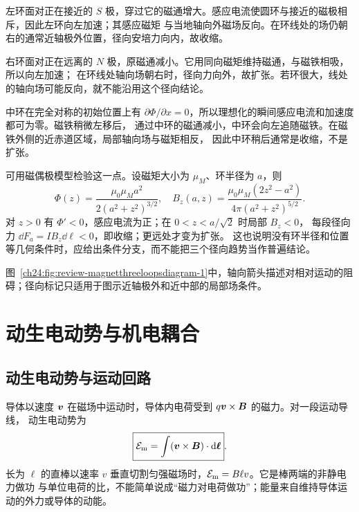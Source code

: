 {\begin{xesolution}
左环面对正在接近的 $S$ 极，穿过它的磁通增大。感应电流使圆环与接近的磁极相斥，因此左环向左加速；其感应磁矩
与当地轴向外磁场反向。在环线处的场仍朝右的通常近轴极外位置，径向安培力向内，故收缩。

右环面对正在远离的 $N$ 极，原磁通减小。它用同向磁矩维持磁通，与磁铁相吸，所以向左加速；
在环线处轴向场朝右时，径向力向外，故扩张。若环很大，线处的轴向场可能反向，就不能沿用这个径向结论。

中环在完全对称的初始位置上有 $\partial\Phi/\partial x=0$，所以理想化的瞬间感应电流和加速度都可为零。磁铁稍微左移后，
通过中环的磁通减小，中环会向左追随磁铁。在磁铁外侧的近赤道区域，局部轴向场与磁矩相反，
因此中环稍后通常是收缩，不是扩张。

可用磁偶极模型检验这一点。设磁矩大小为 $\mu_M$、环半径为 $a$，则
\[
 \Phi(z)=\frac{\mu_0\mu_Ma^2}{2(a^2+z^2)^{3/2}},\quad
 B_z(a,z)=\frac{\mu_0\mu_M(2z^2-a^2)}{4\pi(a^2+z^2)^{5/2}}.
\]
对 $z>0$ 有 $\Phi'<0$，感应电流为正；在 $0<z<a/\sqrt2$ 时局部 $B_z<0$，
每段径向力 $\dd F_a=I B_z\dd\ell<0$，即收缩；更远处才变为扩张。
这也说明没有环半径和位置等几何条件时，应给出条件分支，而不能把三个径向趋势当作普遍结论。

图~\ref{ch24:fig:review-magnetthreeloopsdiagram-1}中，轴向箭头描述对相对运动的阻碍；径向标记只适用于图示近轴极外和近中部的局部场条件。
\par\noindent\begin{minipage}{\linewidth}
\magnetThreeLoopsDiagram
{}
\end{minipage}\par\medskip
\end{xesolution}



\section{动生电动势与机电耦合}

\subsection{动生电动势与运动回路}


导体以速度 $\bm{v}$ 在磁场中运动时，导体内电荷受到 $q\bm{v}\times\bm{B}$ 的磁力。对一段运动导线，
动生电动势为
\begin{equation}
  \boxed{\mathcal E_{\rm m}=\int(\bm{v}\times\bm{B})\cdot\mathop{}\!\mathrm d\bm{\ell}}.
\end{equation}
长为 $\ell$ 的直棒以速率 $v$ 垂直切割匀强磁场时，$\mathcal E_{\rm m}=B\ell v$。它是棒两端的非静电力做功
与单位电荷的比，不能简单说成“磁力对电荷做功”；能量来自维持导体运动的外力或导体的动能。

}
